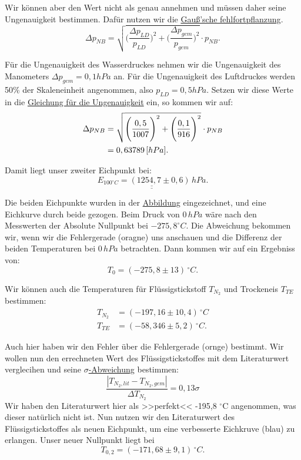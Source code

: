 Wir können aber den Wert nicht als genau annehmen und müssen daher seine Ungenauigkeit bestimmen. Dafür nutzen wir die \hyperref[eq:gauss_fehlfortpflanzung]{Gauß'sche fehlfortpflanzung}.
\begin{equation}
    \Delta p_{NB} = \sqrt{\Bigg(\frac{\Delta p_{LD}}{p_{LD}}\Bigg)^2 + \Bigg(\frac{\Delta p_{gem}}{p_{gem}}\Bigg)^2} \cdot p_{NB}.
    \label{eq:ungenauigkeit_p-nb}
\end{equation}

Für die Ungenauigkeit des Wasserdruckes nehmen wir die Ungenauigkeit des Manometers $\Delta p_{gem} = 0,1 hPa$ an. Für die  Ungenauigkeit des Luftdruckes werden 50\% der Skaleneinheit angenommen, also $p_{LD} = 0,5hPa$.
Setzen wir diese Werte in die \hyperref[eq:ungenauigkeit_p-nb]{Gleichung für die Ungenauigkeit} ein, so kommen wir auf:
\begin{align}
    \Delta p_{NB} &= \sqrt{\Bigg(\frac{0,5}{1007}\Bigg)^2 + \Bigg(\frac{0,1}{916}\Bigg)^2} \cdot p_{NB} \notag \\
     &= 0,63789 \, [hPa].
\end{align}

Damit liegt unser zweiter Eichpunkt bei:
\begin{equation}
    \underline{\underline{E_{100^\circ C} = (1254,7 \pm 0,6) \, hPa}}.
\end{equation}

Die beiden Eichpunkte wurden in der \hyperref[eq]{Abbildung} eingezeichnet, und eine Eichkurve durch beide gezogen. Beim Druck von $0 \, hPa$ wäre nach den Messwerten der Absolute Nullpunkt bei $-275,8^\circ C$.
Die Abweichung bekommen wir, wenn wir die Fehlergerade (oragne) uns anschauen und die Differenz der beiden Temperaturen bei $0 \, hPa$ betrachten. Dann kommen wir auf ein Ergebniss von:
\begin{equation}
    T_0 = (-275,8 \pm 13)  \, ^\circ C.
\end{equation}

Wir können auch die Temperaturen für Flüssigstickstoff $T_{N_2}$ und Trockeneis $T_{TE}$ bestimmen:
\begin{align}
    T_{N_2} &= (-197,16 \pm 10,4) \, ^\circ C \\
    T_{TE} &= (-58,346 \pm 5,2) \, ^\circ C.
\end{align}

Auch hier haben wir den Fehler über die Fehlergerade (ornge) bestimmt. 
Wir wollen nun den errechneten Wert des Flüssigstickstoffes mit dem Literaturwert verglecihen und seine \hyperref[eq:signifikante_abweichung]{$\sigma$-Abweichung} bestimmen:
\begin{equation}
    \frac{\left| T_{N_2,lit} - T_{N_2,gem} \right|}{\Delta T_{N_2}} = 0,13\sigma
\end{equation}
Wir haben den Literaturwert hier als >>perfekt<< -195,8 $^\circ$C angenommen, was dieser natürlich nicht ist. 
Nun nutzen wir den Literaturwert des Flüssigstickstoffes als neuen Eichpunkt, um eine verbesserte Eichkruve (blau) zu erlangen.
Unser neuer Nullpunkt liegt bei
\begin{equation}
    T_{0,2} = (-171,68 \pm 9,1) \, ^\circ C.
\end{equation}

